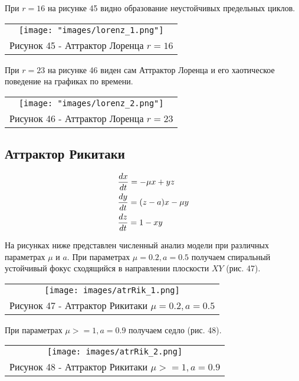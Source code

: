 При $r=16$ на рисунке 45 видно образование неустойчивых предельных циклов.
\begin{center}
  \begin{tabular}{c}
  \texttt{[image: "images/lorenz\_1.png"]}\\
  Рисунок 45 - Аттрактор Лоренца $r=16$
\end{tabular}
\end{center}

При $r=23$ на рисунке 46 виден сам Аттрактор Лоренца и его хаотическое поведение на графиках по времени.
\begin{center}
  \begin{tabular}{c}
  \texttt{[image: "images/lorenz\_2.png"]}\\
  Рисунок 46 - Аттрактор Лоренца $r=23$
\end{tabular}
\end{center}

\subsection{Аттрактор Рикитаки}
\begin{align}
  &\dfrac{d x}{dt} = -\mu x+yz \notag\\
  &\dfrac{d y}{dt} = (z-a)x-\mu y\\
  &\dfrac{d z}{dt} = 1-xy\notag
\end{align}

На рисунках ниже представлен численный анализ модели при различных параметрах $\mu$ и $a$.
При параметрах $\mu=0.2,a=0.5$ получаем спиральный устойчивый фокус сходящийся в направлении плоскости $XY$ (рис. 47).

\begin{center}
  \begin{tabular}{c}
  \texttt{[image: images/atrRik\_1.png]}\\
  Рисунок 47 - Аттрактор Рикитаки $\mu=0.2,a=0.5$
\end{tabular}
\end{center}

При параметрах $\mu>=1,a=0.9$ получаем седло (рис. 48).
\begin{center}
  \begin{tabular}{c}
  \texttt{[image: images/atrRik\_2.png]}\\
  Рисунок 48 - Аттрактор Рикитаки $\mu>=1,a=0.9$
\end{tabular}
\end{center}

